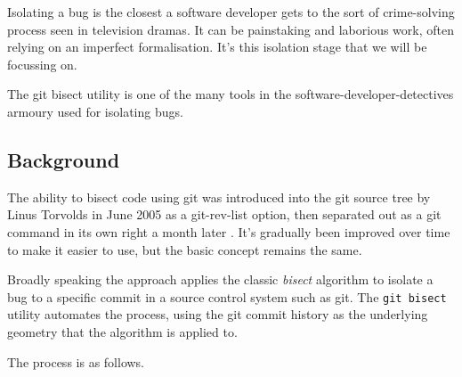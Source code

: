 \documentclass[10pt,journal,compsoc]{IEEEtran}
\begin{document}
Isolating a bug is the closest a software developer gets to the sort of crime-solving process seen in television dramas. It can be painstaking and laborious work, often relying on an imperfect formalisation. It's this isolation stage that we will be focussing on.

The {\code git bisect} utility is one of the many tools in the software-developer-detectives armoury used for isolating bugs.

\subsection{Background}

The ability to bisect code using {\code git} was introduced into the {\code git} source tree by Linus Torvolds in June 2005 \cite{git-commit-8b3a1e056f21} as a {\code git-rev-list} option, then separated out as a {\code git} command in its own right a month later \cite{git-commit-8cc6a0831988}. It's gradually been improved over time to make it easier to use, but the basic concept remains the same.

Broadly speaking the approach applies the classic {\it bisect\/} algorithm to isolate a bug to a specific commit in a source control system such as git. The {\tt git bisect} utility automates the process, using the git commit history as the underlying geometry that the algorithm is applied to.

The process is as follows.
\end{document}
